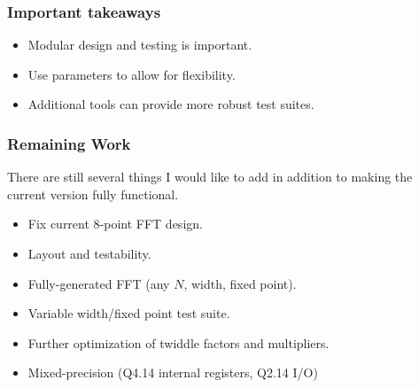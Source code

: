 \documentclass{beamer}
\begin{document}
\begin{frame}
	\frametitle{Important takeaways}
	\begin{itemize}
		\item Modular design and testing is important.
		\item Use parameters to allow for flexibility.
		\item Additional tools can provide more robust test suites.
	\end{itemize}

\end{frame}

\begin{frame}
	\frametitle{Remaining Work}
	There are still several things I would like to add in addition to making
	the current version fully functional.
	\begin{itemize}
		\item Fix current 8-point FFT design.
		\item Layout and testability.
		\item Fully-generated FFT (any $N$, width, fixed point).
		\item Variable width/fixed point test suite.
		\item Further optimization of twiddle factors and multipliers.
		\item Mixed-precision (Q4.14 internal registers, Q2.14 I/O)
	\end{itemize}

\end{frame}
\end{document}

